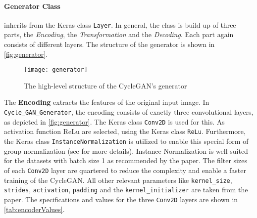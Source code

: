 \documentclass[fleqn,10pt]{SelfArx} %
\begin{document}
\paragraph{Generator Class} inherits from the Keras class \texttt{Layer}. In general, the class is build up of three parts, the \textit{Encoding}, the \textit{Transformation} and the \textit{Decoding}. Each part again consists of different layers. The structure of the generator is shown in \autoref{fig:generator}.~\cite{Introduction-to-Cycle-GANs}

\begin{figure*}[htb] 
	\centering 
	\texttt{[image: generator]}
	\caption{The high-level structure of the Cycle\ac{GAN}'s generator \cite{Introduction-to-Cycle-GANs}}
	\label{fig:generator}
\end{figure*}

The \textbf{Encoding} extracts the features of the original input image. In \texttt{Cycle\_GAN\_Generator}, the encoding consists of exactly three convolutional layers, as depicted in \autoref{fig:generator}. The Keras class \texttt{Conv2D} is used for this. As activation function \ac{ReLu} are selected, using the Keras class \texttt{ReLu}. Furthermore, the Keras class \texttt{InstanceNormalization} is utilized to enable this special form of group normalization (see \cite{google-tf-InstanceNormalization} for more details). Instance Normalization is well-suited for the datasets with batch size 1 as recommended by the paper. The filter sizes of each \texttt{Conv2D} layer are quartered to reduce the complexity and enable a faster training of the Cycle\ac{GAN}. All other relevant parameters like \texttt{kernel\_size}, \texttt{strides}, \texttt{activation}, \texttt{padding} and the \texttt{kernel\_initializer} are taken from the paper. The specifications and values for the three \texttt{Conv2D} layers are shown in \autoref{tab:encoderValues}.~\cite{image-to-image-ccan}
\end{document}
